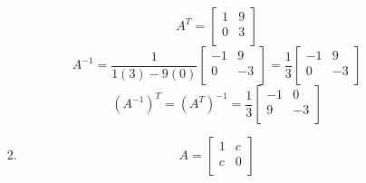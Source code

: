 \documentclass[12pt,letterpaper]{article}
\begin{document}
\begin{enumerate}
\begin{enumerate}
\begin{enumerate}
              \[
                A^T
                =
                \begin{bmatrix}
                   1 &  9 \\
                   0 &  3 \\
                \end{bmatrix}
              \]
              \[
                A^{-1}
                =
                \frac{1}{1(3) - 9(0)}
                \begin{bmatrix}
                  -1 &  9 \\
                   0 & -3 \\
                \end{bmatrix}
                =
                \frac{1}{3}
                \begin{bmatrix}
                  -1 &  9 \\
                   0 & -3 \\
                \end{bmatrix}
              \]
              \[
                \left(A^{-1}\right)^T
                =
                \left(A^T\right)^{-1}
                =
                \frac{1}{3}
                \begin{bmatrix}
                  -1 &  0 \\
                   9 & -3 \\
                \end{bmatrix}
              \]
            \item
              \[
                A
                =
                \begin{bmatrix}
                   1 &  c \\
                   c &  0 \\
                \end{bmatrix}
              \]


\end{enumerate}
\end{enumerate}
\end{enumerate}
\end{document}
